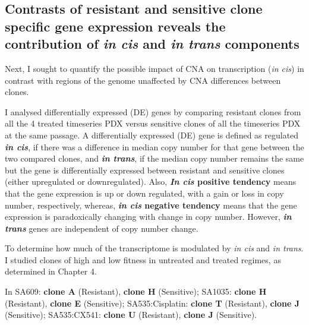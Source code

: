 
\subsection{Contrasts of resistant and sensitive clone specific gene expression reveals the contribution of \textit{in cis} and \textit{in trans} components}

Next, I sought to quantify the possible impact of CNA on transcription (\textit{in cis}) in contrast with regions of the genome unaffected by CNA differences between clones.


I analysed differentially expressed (DE) genes by comparing resistant clones from all the 4 treated timeseries PDX versus sensitive clones of all the timeseries PDX at the same passage. A  differentially expressed (DE) gene is defined as regulated \textbf{\textit{in cis}}, if there was a difference in median copy number for that gene between the two compared clones, and \textbf{\textit{in trans}}, if the median copy number remains the same but the gene is differentially expressed between resistant and sensitive clones (either upregulated or downregulated). Also, \textbf{{\textit{In cis} positive tendency}} means that the gene expression is up or down regulated, with a gain or loss in copy number, respectively, whereas, \textbf{{\textit{in cis} negative tendency}} means that the gene expression is paradoxically changing with change in copy number. However, \textbf{\textit{in trans}} genes are independent of copy number change.

To determine how much of the transcriptome is modulated by \textit{in cis} and \textit{in trans}. I studied clones of high and low fitness in untreated and treated regimes, as determined in Chapter 4.

 In SA609: \textbf{clone A} (Resistant), \textbf{clone H} (Sensitive);  SA1035: \textbf{clone H} (Resistant), \textbf{clone E} (Sensitive); SA535:Cisplatin: \textbf{clone T} (Resistant), \textbf{clone J} (Sensitive); SA535:CX541: \textbf{clone U} (Resistant), \textbf{clone J} (Sensitive). 
 
